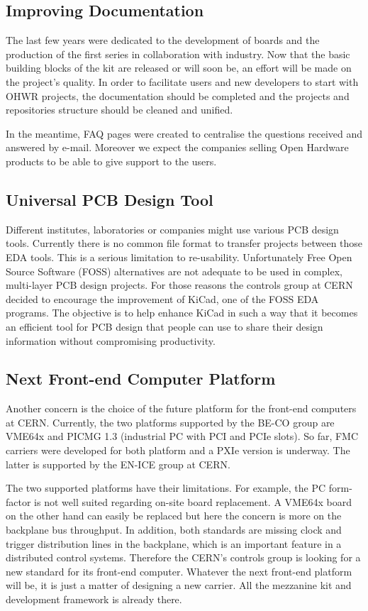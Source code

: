 \documentclass{JAC2003}
\begin{document}
\subsection{Improving Documentation}
The last few years were dedicated to the development of boards and the production of the first series in collaboration with industry.
Now that the basic building blocks of the kit are released or will soon be, an effort will be made on the project's quality.
In order to facilitate users and new developers to start with OHWR projects, the documentation should be completed and the projects and repositories structure should be cleaned and unified.

In the meantime, FAQ pages were created to centralise the questions received and answered by e-mail.
Moreover we expect the companies selling Open Hardware products to be able to give support to the users.

\subsection{Universal PCB Design Tool}
Different institutes, laboratories or companies might use various PCB design tools.
Currently there is no common file format to transfer projects between those EDA tools.
This is a serious limitation to re-usability.
Unfortunately Free Open Source Software (FOSS) alternatives are not adequate to be used in complex, multi-layer PCB design projects.
For those reasons the controls group at CERN decided to encourage the improvement of KiCad, one of the FOSS EDA programs.
The objective is to help enhance KiCad in such a way that it becomes an efficient tool for PCB design that people can use to share their design information without compromising productivity.

\subsection{Next Front-end Computer Platform}
Another concern is the choice of the future platform for the front-end computers at CERN.
Currently, the two platforms supported by the BE-CO group are VME64x and PICMG 1.3 (industrial PC with PCI and PCIe slots).
So far, FMC carriers were developed for both platform and a PXIe version is underway.
The latter is supported by the EN-ICE group at CERN.

The two supported platforms have their limitations.
For example, the PC form-factor is not well suited regarding on-site board replacement.
A VME64x board on the other hand can easily be replaced but here the concern is more on the backplane bus throughput.
In addition, both standards are missing clock and trigger distribution lines in the backplane, which is an important feature in a distributed control systems.
Therefore the CERN's controls group is looking for a new standard for its front-end computer.
Whatever the next front-end platform will be, it is just a matter of designing a new carrier. All the mezzanine kit and development framework is already there.
\end{document}
